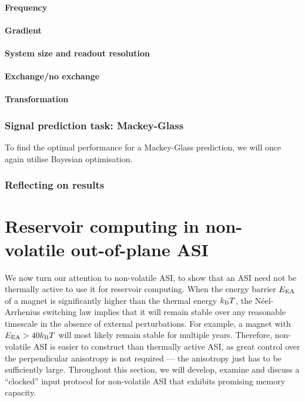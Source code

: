 \paragraph{Frequency}
\paragraph{Gradient}
\paragraph{System size and readout resolution}
\paragraph{Exchange/no exchange}
\paragraph{Transformation}
\subsubsection{Signal prediction task: Mackey-Glass}
To find the optimal performance for a Mackey-Glass prediction, we will once again utilise Bayesian optimisation.
\subsubsection{Reflecting on results} %

\newpage
\section{Reservoir computing in non-volatile out-of-plane ASI}
We now turn our attention to non-volatile ASI, to show that an ASI need not be thermally active to use it for reservoir computing.
When the energy barrier $E_\mathrm{EA}$ of a magnet is significantly higher than the thermal energy $\kBT$, the N\'eel-Arrhenius switching law implies that it will remain stable over any reasonable timescale in the absence of external perturbations.
For example, a magnet with $\EEA > 40 \kBT$ will most likely remain stable for multiple years.
Therefore, non-volatile ASI is easier to construct than thermally active ASI, as great control over the perpendicular anisotropy is not required --- the anisotropy just has to be sufficiently large.
Throughout this section, we will develop, examine and discuss a ``clocked'' input protocol for non-volatile ASI that exhibits promising memory capacity.

